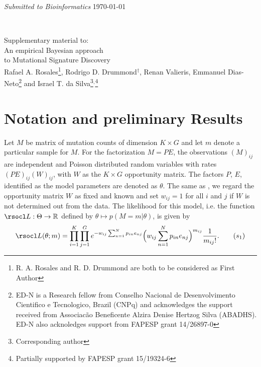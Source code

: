 \documentclass[11pt]{amsart}
\theoremstyle{definition}
\begin{document}
\title[\textup{R. A. Rosales, R. D. Drummond, 
       R. Valieris, E. Dias-Neto, I. T. da Silva}]{} 
\noindent\parbox{\linewidth}{\footnotesize %
    {\footnotesize\textsl{Submitted to Bioinformatics }}
    {\footnotesize\textrm{\hfill\today}}
  }\\[1em]
 \begin{center}
   {\large Supplementary material to:}\\[1em]
   {\Large\sc An empirical Bayesian approach}\\[0.3em] 
   {\Large\sc to Mutational Signature Discovery}\\[2em]
   {\large 
     Rafael A. Rosales\footnote{R. A. Rosales and R. D. Drummond are
       both to be considered as First Author}, 
     Rodrigo D. Drummond$^\dagger$,
     Renan Valieris, Emmanuel Dias-Neto\footnote{ED-N is a Research
       fellow from Conselho Nacional de Desenvolvimento Cientifico 
       e Tecnologico, Brazil (CNPq) and acknowledges the support
       received from Associac\~ao Beneficente Alzira Denise Hertzog
       Silva (ABADHS). ED-N also acknoledges support from FAPESP grant
       14/26897-0} and
     Israel T. da Silva\footnote{Corresponding
       author}$^,$\footnote{Partially supported by FAPESP grant 15/19324-6}}
 \end{center}

\maketitle

\tableofcontents 

\section{Notation and preliminary Results}
Let $M$ be matrix of mutation counts of dimension $K\times G$ and let
$m$ denote a particular sample for $M$. For the factorization $M=PE$,
the observations $(M)_{ij}$ are independent and Poisson distributed
random variables with rates $(PE)_{ij}(W)_{ij}$, with $W$ as the
$K\times G$ opportunity matrix. The factors $P$, $E$, identified as
the model parameters are denoted as $\theta$. The same as 
\cite{FICMV}, we regard the opportunity matrix $W$ as fixed and known
and set $w_{ij} = 1$ for all $i$ and $j$ if $W$ is not determined out
from the data. The likelihood for this model, i.e. the function
$\rsocl L: \Theta \to \mathbb R$ defined by $\theta \mapsto p(M=m|\theta)$, is given by 
\begin{equation}
  \label{eqn:PoisLik}
   \rsocl L(\theta; m) 
   =
    \prod_{i=1}^K \prod_{j=1}^G e^{-w_{ij}\sum_{n=1}^{N}p_{in}e_{nj}}
    \Big(w_{ij}\sum_{n=1}^{N}p_{in}e_{nj}\Big)^{m_{ij}}
    \frac{1}{m_{ij}!}.\tag{$s_1$}
\end{equation}
\end{document}

